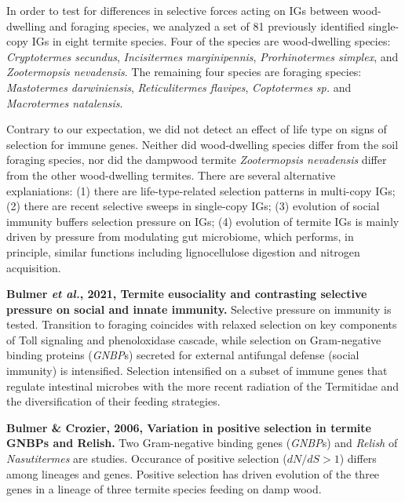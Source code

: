 \documentclass[11pt]{article}
\begin{document}
\begin{sloppypar}
\par
In order to test for differences in selective forces acting on IGs between wood-dwelling and foraging species, we analyzed a set of 81 previously identified single-copy IGs in eight termite species. 
Four of the species are wood-dwelling species: \textit{Cryptotermes secundus}, \textit{Incisitermes marginipennis}, \textit{Prorhinotermes simplex}, and \textit{Zootermopsis nevadensis}. 
The remaining four species are foraging species: \textit{Mastotermes darwiniensis}, \textit{Reticulitermes flavipes}, \textit{Coptotermes sp.} and \textit{Macrotermes natalensis}. 
\par
Contrary to our expectation, we did not detect an effect of life type on signs of selection for immune genes. 
Neither did wood-dwelling species differ from the soil foraging species, nor did the dampwood termite \textit{Zootermopsis nevadensis} differ from the other wood-dwelling termites. 
There are several alternative explaniations: 
(1) there are life-type-related selection patterns in multi-copy IGs; 
(2) there are recent selective sweeps in single-copy IGs; 
(3) evolution of social immunity buffers selection pressure on IGs; 
(4) evolution of termite IGs is mainly driven by pressure from modulating gut microbiome, which performs, in principle, similar functions including lignocellulose digestion and nitrogen acquisition. 
\par
\textbf{Bulmer \textit{et al.}, 2021, Termite eusociality and contrasting selective pressure on social and innate immunity.} \newline
Selective pressure on immunity is tested. 
Transition to foraging coincides with relaxed selection on key components of Toll signaling and phenoloxidase cascade, while selection on Gram-negative binding proteins (\textit{GNBP}s) secreted for external antifungal defense (social immunity) is intensified. 
Selection intensified on a subset of immune genes that regulate intestinal microbes with the more recent radiation of the Termitidae and the diversification of their feeding strategies.
\par
\textbf{Bulmer & Crozier, 2006, Variation in positive selection in termite GNBPs and Relish.} \newline
Two Gram-negative binding genes (\textit{GNBP}s) and \textit{Relish} of \textit{Nasutitermes} are studies. 
Occurance of positive selection ($dN/dS>1$) differs among lineages and genes. 
Positive selection has driven evolution of the three genes in a lineage of three termite species feeding on damp wood. 

\end{sloppypar}
\end{document}
